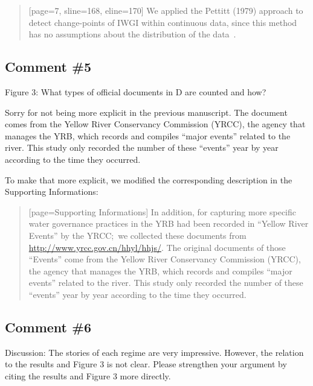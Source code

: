 \begin{quote}[page=7, sline=168, eline=170]
    We applied the Pettitt (1979) approach to detect change-points of IWGI within continuous data, since this method has no assumptions about the distribution of the data~\cite{pettitt1979}.
\end{quote}

\subsection{Comment \#5}
\RC{} Figure 3: What types of official documents in D are counted and how?

\AR{} Sorry for not being more explicit in the previous manuscript. The document comes from the Yellow River Conservancy Commission (YRCC), the agency that manages the YRB, which records and compiles ``major events'' related to the river. This study only recorded the number of these ``events'' year by year according to the time they occurred.

\AR*{} To make that more explicit, we modified the corresponding description in the Supporting Informations:

\begin{quote}[page=Supporting Informations]
    In addition, for capturing more specific water governance practices in the YRB had been recorded in ``Yellow River Events'' by the YRCC;\ we collected these documents from \url{http://www.yrcc.gov.cn/hhyl/hhjs/}.
    The original documents of those ``Events'' come from the Yellow River Conservancy Commission (YRCC), the agency that manages the YRB, which records and compiles ``major events'' related to the river. This study only recorded the number of these ``events'' year by year according to the time they occurred.
\end{quote}

\subsection{Comment \#6}
\RC{} Discussion: The stories of each regime are very impressive. However, the relation to the results and Figure 3 is not clear. Please strengthen your argument by citing the results and Figure 3 more directly.

